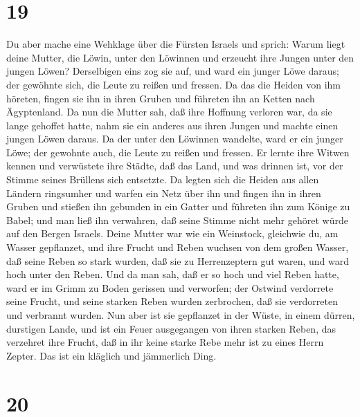 \hypertarget{section-18}{%
\section{19}\label{section-18}}

 Du aber mache eine Wehklage über die Fürsten Israels
 und sprich: Warum liegt deine Mutter, die Löwin, unter den
Löwinnen und erzeucht ihre Jungen unter den jungen Löwen? 
Derselbigen eins zog sie auf, und ward ein junger Löwe daraus; der
gewöhnte sich, die Leute zu reißen und fressen.  Da das die
Heiden von ihm höreten, fingen sie ihn in ihren Gruben und führeten ihn
an Ketten nach Ägyptenland.  Da nun die Mutter sah, daß ihre
Hoffnung verloren war, da sie lange gehoffet hatte, nahm sie ein anderes
aus ihren Jungen und machte einen jungen Löwen daraus.  Da
der unter den Löwinnen wandelte, ward er ein junger Löwe; der gewohnte
auch, die Leute zu reißen und fressen.  Er lernte ihre
Witwen kennen und verwüstete ihre Städte, daß das Land, und was drinnen
ist, vor der Stimme seines Brüllens sich entsetzte.  Da
legten sich die Heiden aus allen Ländern ringsumher und warfen ein Netz
über ihn und fingen ihn in ihren Gruben  und stießen ihn
gebunden in ein Gatter und führeten ihn zum Könige zu Babel; und man
ließ ihn verwahren, daß seine Stimme nicht mehr gehöret würde auf den
Bergen Israels.  Deine Mutter war wie ein Weinstock,
gleichwie du, am Wasser gepflanzet, und ihre Frucht und Reben wuchsen
von dem großen Wasser,  daß seine Reben so stark wurden,
daß sie zu Herrenzeptern gut waren, und ward hoch unter den Reben. Und
da man sah, daß er so hoch und viel Reben hatte,  ward er
im Grimm zu Boden gerissen und verworfen; der Ostwind verdorrete seine
Frucht, und seine starken Reben wurden zerbrochen, daß sie verdorreten
und verbrannt wurden.  Nun aber ist sie gepflanzet in der
Wüste, in einem dürren, durstigen Lande,  und ist ein Feuer
ausgegangen von ihren starken Reben, das verzehret ihre Frucht, daß in
ihr keine starke Rebe mehr ist zu eines Herrn Zepter. Das ist ein
kläglich und jämmerlich Ding.

\hypertarget{section-19}{%
\section{20}\label{section-19}}

